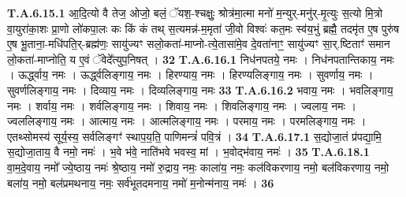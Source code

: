 \documentclass[17pt]{extarticle}
\begin{document}
                                \textbf{ T.A.6.15.1} \newline
                  आ॒दि॒त्यो वै तेज॒ ओजो॒ बलं॒ ॅयश॒-श्चक्षुः॒ श्रोत्र॑मा॒त्मा मनो॑ म॒न्युर्-मनु॑र्-मृ॒त्युः स॒त्यो मि॒त्रो वा॒युरा॑का॒शः प्रा॒णो लो॑कपा॒लः कः किं कं तथ् स॒त्यमन्न॑-म॒मृता॑ जी॒वो विश्वः॑ कत॒मः स्व॑य॒भुं ब्रह्मै॒ तदमृ॑त ए॒ष पुरु॑ष ए॒ष भू॒ताना॒-मधि॑पति॒र्-ब्रह्म॑णः॒ सायु॑ज्यꣳ सलो॒कता॑-माप्नो-त्ये॒तासा॑मे॒व दे॒वता॑नाꣳ॒॒ सायु॑ज्यꣳ सा॒र्.ष्टिताꣳ॑ समान लो॒कता॑-माप्नोति॒ य ए॒वं ॅवेदे᳚त्युप॒निषत् । \textbf{ 32} \newline
                  \newline
                                                         \textbf{} \newline \newline
                                \textbf{ T.A.6.16.1} \newline
                  निध॑नपतये॒ नमः । निध॑नपतान्तिकाय॒ नमः ।  ऊर्द्ध्वाय॒ नमः । ऊर्द्ध्वलिङ्गाय॒ नमः ।  हिरण्याय॒ नमः । हिरण्यलिङ्गाय॒ नमः ।  सुवर्णाय॒ नमः । सुवर्णलिङ्गाय॒ नमः ।  दिव्याय॒ नमः । दिव्यलिङ्गाय॒ नमः \textbf{ 33} \newline
                  \newline
                                                                  \textbf{ T.A.6.16.2} \newline
                  भवाय॒ नमः । भवलिङ्गाय॒ नमः ।  शर्वाय॒ नमः । शर्वलिङ्गाय॒ नमः ।  शिवाय॒ नमः । शिवलिङ्गाय॒ नमः ।  ज्वलाय॒ नमः । ज्वललिङ्गाय॒ नमः ।  आत्माय॒ नमः । आत्मलिङ्गाय॒ नमः ।  परमाय॒ नमः । परमलिङ्गाय॒ नमः ।  एतथ्सोमस्य॑ सूर्य॒स्य॒ सर्वलिङ्गꣳ॑ स्थाप॒य॒ति॒ पाणिमन्त्रं॑ पवि॒त्रं । \textbf{ 34} \newline
                  \newline
                                                         \textbf{} \newline \newline
                                \textbf{ T.A.6.17.1} \newline
                  स॒द्योजा॒तं प्र॑पद्या॒मि॒ स॒द्योजा॒ताय॒ वै नमो॒ नमः॑ । भ॒वे भ॑वे॒ नाति॑भवे भवस्व॒ मां । भ॒वोद्भ॑वाय॒ नमः॑ । \textbf{ 35} \newline
                  \newline
                                                         \textbf{} \newline \newline
                                \textbf{ T.A.6.18.1} \newline
                  वा॒म॒दे॒वाय॒ नमो᳚ ज्ये॒ष्ठाय॒ नमः॑ श्रे॒ष्ठाय॒ नमो॑ रु॒द्राय॒ नमः॒ काला॑य॒  नमः॒ कल॑विकरणाय॒ नमो॒ बल॑विकरणाय॒ नमो॒ बला॑य॒ नमो॒ बल॑प्रमथनाय॒ नमः॒ सर्व॑भूतदमनाय॒ नमो॑ म॒नोन्म॑नाय॒ नमः॑ । \textbf{ 36} \newline
\end{document}

